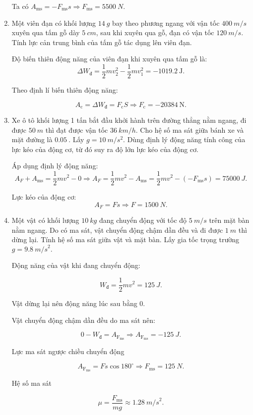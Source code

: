 \begin{enumerate}[label=\bfseries Câu \arabic*:, leftmargin=1.5cm]
{\begin{enumerate}[label=\alph*)]
		Ta có $A_\text{ms} = -F_\text{ms} s \Rightarrow F_\text{ms} = \SI{5500}{N}$.
	\end{enumerate}
}

\item {}


{
	Một viên đạn có khối lượng $\SI{14}{g}$ bay theo phương ngang với vận tốc $\SI{400}{m/s}$ xuyên qua tấm gỗ dày $\SI{5}{cm}$, sau khi xuyên qua gỗ, đạn có vận tốc $\SI{120}{m/s}$. Tính lực cản trung bình của tấm gỗ tác dụng lên viên đạn.
}

\hideall
{	
	Độ biến thiên động năng của viên đạn khi xuyên qua tấm gỗ là:
	$$\Delta W_\text{đ} = \dfrac{1}{2}mv^2_2 - \dfrac{1}{2}mv_1^2 = - \SI{1019.2}{\joule}.$$
	
	Theo định lí biến thiên động năng:
	
	$$A_\text{c} = \Delta W_\text{đ} = F_\text{c}S \Rightarrow F_\text{c} = -\SI{20384}{\newton}.$$
	
}

	\item {}


{
	Xe ô tô khối lượng 1 tấn bắt đầu khởi hành trên đường thẳng nằm ngang, đi được $\SI{50}{m}$ thì đạt được vận tốc $\SI{36}{km/h}$. Cho hệ số ma sát giữa bánh xe và mặt đường là $\SI{0.05}{}$. Lấy $g=\SI{10}{m/s^2}$. Dùng định lý động năng tính công của lực kéo của động cơ, từ đó suy ra độ lớn lực kéo của động cơ.
}

\hideall
{	
	Áp dụng định lý động năng:
	$$A_F + A_\text{ms} = \dfrac{1}{2}mv^2 - 0 \Rightarrow A_F = \dfrac{1}{2}mv^2 - A_\text{ms} = \dfrac{1}{2}mv^2 - (-F_\text{ms}s) = \SI{75000}{J}.$$
	
	Lực kéo của động cơ:
	$$A_F=Fs \Rightarrow F = \SI{1500}{N}.$$
}

\item {}


{
	Một vật có khối lượng $\SI{10}{kg}$ đang chuyển động với tốc độ $\SI{5}{m/s}$ trên mặt bàn nằm ngang. Do có ma sát, vật chuyển động chậm dần đều và đi được $\SI{1}{m}$ thì dừng lại. Tính hệ số ma sát giữa vật và mặt bàn. Lấy gia tốc trọng trường $g = \SI{9,8}{m/s}^2.$
}

\hideall
{	
	Động năng của vật khi đang chuyển động:
	
	$$W_\text{đ} = \dfrac{1}{2}mv^2 = \SI{125}{J}.$$
	
	Vật dừng lại nên động năng lúc sau bằng 0.
	
	Vật chuyển động chậm dần đều do ma sát nên:
	
	$$0- W_\text{đ} = A_{\text{F}_\text{ms}} \Rightarrow A_{\text{F}_\text{ms}} = - \SI{125}{J}.$$
	
	Lực ma sát ngược chiều chuyển động
	
	$$A_{\text{F}_\text{ms}} = Fs\cos 180^\circ \Rightarrow F_\text{ms} = \SI{125}{N}.$$
	
	Hệ số ma sát
	
	$$\mu = \dfrac{F_\text{ms}}{mg} \approx \SI{1,28}{m/s}^2.$$
}
	
\end{enumerate}